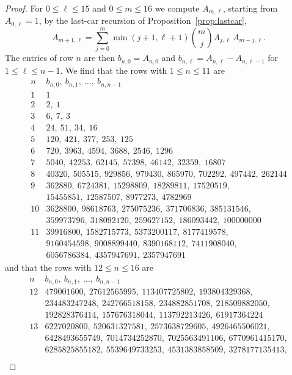 \documentclass{amsart}
\theoremstyle{definition}
\theoremstyle{remark}
\numberwithin{equation}{section}
\begin{document}
\begin{proof}
For $0\le\ell\le 15$ and $0\le m\le 16$ we compute $A_{m,\ell}$, starting from $A_{0,\ell}=1$, by the last-car recursion of Proposition~\ref{prop:lastcar},
\[
A_{m+1,\ell}=\sum_{j=0}^{m}\min(j+1,\ell+1)\binom{m}{j}A_{j,\ell}\,A_{m-j,\ell}.
\]
The entries of row $n$ are then $b_{n,0}=A_{n,0}$ and $b_{n,\ell}=A_{n,\ell}-A_{n,\ell-1}$ for $1\le\ell\le n-1$. We find that the rows with $1\le n\le 11$ are
\[
\begin{array}{r|l}
n & b_{n,0},\ b_{n,1},\ \dots,\ b_{n,n-1}\\ \hline
1 & 1\\
2 & 2,\ 1\\
3 & 6,\ 7,\ 3\\
4 & 24,\ 51,\ 34,\ 16\\
5 & 120,\ 421,\ 377,\ 253,\ 125\\
6 & 720,\ 3963,\ 4594,\ 3688,\ 2546,\ 1296\\
7 & 5040,\ 42253,\ 62145,\ 57398,\ 46142,\ 32359,\ 16807\\
8 & 40320,\ 505515,\ 929856,\ 979430,\ 865970,\ 702292,\ 497442,\ 262144\\
9 & 362880,\ 6724381,\ 15298809,\ 18289811,\ 17520519,\\
 & 15455851,\ 12587507,\ 8977273,\ 4782969\\
10 & 3628800,\ 98618763,\ 275075236,\ 371706836,\ 385131546,\\
 & 359973796,\ 318092120,\ 259627152,\ 186093442,\ 100000000\\
11 & 39916800,\ 1582715773,\ 5373200117,\ 8177419578,\\
 & 9160454598,\ 9008899440,\ 8390168112,\ 7411908040,\\
 & 6056786384,\ 4357947691,\ 2357947691
\end{array}
\]
and that the rows with $12\le n\le 16$ are
\[
\begin{array}{r|l}
n & b_{n,0},\ b_{n,1},\ \dots,\ b_{n,n-1}\\ \hline
12 & 479001600,\ 27612565995,\ 113407725802,\ 193804329368,\\
 & 234483247248,\ 242766518158,\ 234882851708,\ 218509882050,\\
 & 192828376414,\ 157676318044,\ 113792213426,\ 61917364224\\
13 & 6227020800,\ 520631327581,\ 2573638729605,\ 4926465506021,\\
 & 6428493655749,\ 7014734252870,\ 7025563491106,\ 6770961415170,\\
 & 6285825855182,\ 5539649733253,\ 4531383858509,\ 3278177135413,\\

\end{array}\]
\end{proof}
\end{document}
